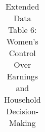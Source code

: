 \begin{longtable}{llcccccccccc}
\caption{Extended Data Table 6: Women's Control Over Earnings and Household Decision-Making} \label{tab:pap__b10z} \\                                                                                                                                                                                                                                                                                                                                                                                                                                                                                                                                                                                                                                                                                                                                                                                             
\hline \hline                                                                                                                                                                                                                                                                                                                                                                                                                                                                                                                                                                                                                                                                                                                                                                                                                                                                                                     

\end{longtable}
